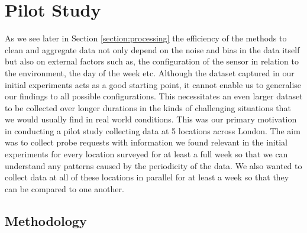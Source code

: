 \section{Pilot Study}

As we see later in Section \ref{section:processing} the efficiency of the methods to clean and aggregate data not only depend on the noise and bias in the data itself but also on external factors such as, the configuration of the sensor in relation to the environment, the day of the week etc.
Although the dataset captured in our initial experiments acts as a good starting point, it cannot enable us to generalise our findings to all possible configurations.
This necessitates an even larger dataset to be collected over longer durations in the kinds of challenging situations that we would usually find in real world conditions.
This was our primary motivation in conducting a pilot study collecting data at 5 locations across London.
The aim was to collect probe requests with information we found relevant in the initial experiments for every location surveyed for at least a full week so that we can understand any patterns caused by the periodicity of the data.
We also wanted to collect data at all of these locations in parallel for at least a week so that they can be compared to one another. 

\subsection{Methodology}

